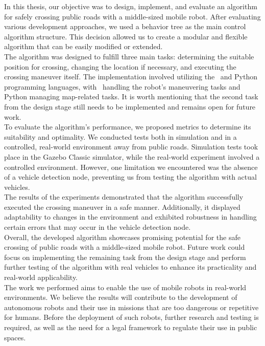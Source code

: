 In this thesis, our objective was to design, implement, and evaluate an algorithm for safely crossing public roads with a middle-sized mobile robot. After evaluating various development approaches, we used a behavior tree as the main control algorithm structure. This decision allowed us to create a modular and flexible algorithm that can be easily modified or extended.\\
The algorithm was designed to fulfill three main tasks: determining the suitable position for crossing, changing the location if necessary, and executing the crossing maneuver itself. The implementation involved utilizing the \CC\ and Python programming languages, with \CC\ handling the robot's maneuvering tasks and Python managing map-related tasks. It is worth mentioning that the second task from the design stage still needs to be implemented and remains open for future work.\\
To evaluate the algorithm's performance, we proposed metrics to determine its suitability and optimality. We conducted tests both in simulation and in a controlled, real-world environment away from public roads. Simulation tests took place in the Gazebo Classic simulator, while the real-world experiment involved a controlled environment. However, one limitation we encountered was the absence of a vehicle detection node, preventing us from testing the algorithm with actual vehicles.\\
The results of the experiments demonstrated that the algorithm successfully executed the crossing maneuver in a safe manner. Additionally, it displayed adaptability to changes in the environment and exhibited robustness in handling certain errors that may occur in the vehicle detection node.\\
Overall, the developed algorithm showcases promising potential for the safe crossing of public roads with a middle-sized mobile robot. Future work could focus on implementing the remaining task from the design stage and perform further testing of the algorithm with real vehicles to enhance its practicality and real-world applicability.\\
The work we performed aims to enable the use of mobile robots in real-world environments. We believe the results will contribute to the development of autonomous robots and their use in missions that are too dangerous or repetitive for humans. Before the deployment of such robots, further research and testing is required, as well as the need for a legal framework to regulate their use in public spaces.

